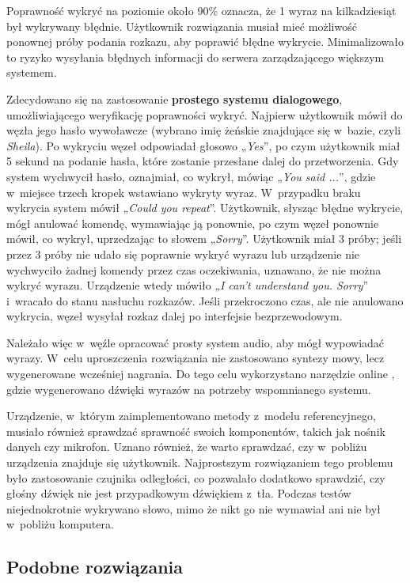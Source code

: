 Poprawność wykryć na poziomie około 90\% oznacza, że 1 wyraz na kilkadziesiąt był wykrywany błędnie. Użytkownik rozwiązania musiał mieć możliwość ponownej próby podania rozkazu, aby poprawić błędne wykrycie. Minimalizowało to ryzyko wysyłania błędnych informacji do serwera zarządzającego większym systemem.

Zdecydowano się na zastosowanie \textbf{prostego systemu dialogowego}, umożliwiającego weryfikację poprawności wykryć. Najpierw użytkownik mówił do węzła jego hasło wywoławcze (wybrano imię żeńskie znajdujące się w~bazie, czyli \textit{Sheila}). Po wykryciu węzeł odpowiadał głosowo „\textit{Yes}”, po czym użytkownik miał 5 sekund na podanie hasła, które zostanie przesłane dalej do przetworzenia. Gdy system wychwycił hasło, oznajmiał, co wykrył, mówiąc „\textit{You said ...}”, gdzie w~miejsce trzech kropek wstawiano wykryty wyraz. W~przypadku braku wykrycia system mówił „\textit{Could you repeat}”. Użytkownik, słysząc błędne wykrycie, mógł anulować komendę, wymawiając ją ponownie, po czym węzeł ponownie mówił, co wykrył, uprzedzając to słowem „\textit{Sorry}”. Użytkownik miał 3 próby; jeśli przez 3 próby nie udało się poprawnie wykryć wyrazu lub urządzenie nie wychwyciło żadnej komendy przez czas oczekiwania, uznawano, że nie można wykryć wyrazu. Urządzenie wtedy mówiło „\textit{I can't understand you. Sorry}” i~wracało do stanu nasłuchu rozkazów. Jeśli przekroczono czas, ale nie anulowano wykrycia, węzeł wysyłał rozkaz dalej po interfejsie bezprzewodowym.

Należało więc w~węźle opracować prosty system audio, aby mógł wypowiadać wyrazy. W~celu uproszczenia rozwiązania nie zastosowano syntezy mowy, lecz wygenerowane wcześniej nagrania. Do tego celu wykorzystano narzędzie online \cite{Nagrania}, gdzie wygenerowano dźwięki wyrazów na potrzeby wspomnianego systemu.

Urządzenie, w~którym zaimplementowano metody z~modelu referencyjnego, musiało również sprawdzać sprawność swoich komponentów, takich jak nośnik danych czy mikrofon. Uznano również, że warto sprawdzać, czy w~pobliżu urządzenia znajduje się użytkownik. Najprostszym rozwiązaniem tego problemu było zastosowanie czujnika odległości, co pozwalało dodatkowo sprawdzić, czy głośny dźwięk nie jest przypadkowym dźwiękiem z~tła. Podczas testów niejednokrotnie wykrywano słowo, mimo że nikt go nie wymawiał ani nie był w~pobliżu komputera.


\subsection{Podobne rozwiązania}

